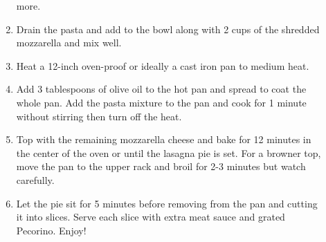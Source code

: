 \documentclass[web-recipes.tex]{subfiles}
\begin{document}
\begin{mdframed}[nobreak]
\begin{minipage}[t]{0.55\textwidth}
\begin{description}
\begin{enumerate}
            more.
          \item Drain the pasta and add to the bowl along with 2
            cups of the shredded mozzarella and mix well.
          \item Heat a 12-inch oven-proof or ideally a cast iron
            pan to medium heat.
          \item Add 3 tablespoons of olive oil to the hot pan and
            spread to coat the whole pan. Add the pasta mixture to
            the pan and cook for 1 minute without stirring then
            turn off the heat.
          \item Top with the remaining mozzarella cheese and bake
            for 12 minutes in the center of the oven or until the
            lasagna pie is set. For a browner top, move the pan to
            the upper rack and broil for 2-3 minutes but watch
            carefully.
          \item Let the pie sit for 5 minutes before removing from
            the pan and cutting it into slices. Serve each slice
            with extra meat sauce and grated Pecorino. Enjoy!
        \end{enumerate}
    \end{description}
  \end{minipage}

  \vspace{3em}
  \centering{\small\ttfamily \url{\myurl}}
\end{mdframed}
\end{document}
